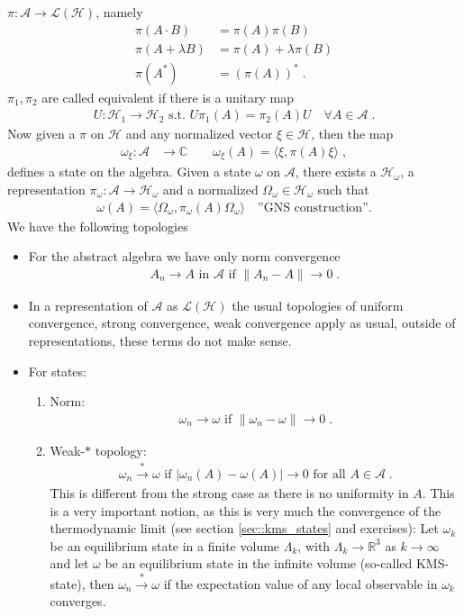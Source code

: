 \documentclass[
a4paper, %
11pt, %
onecolumn, %
openany, %
]{memoir}
\theoremstyle{definition}
\theoremstyle{remark}
\theoremstyle{plain}
\begin{document}
$\pi:\mathcal{A}\longrightarrow \mathcal{L}(\mathcal{H})$, namely \begin{align}
\pi(A\cdot B)&=\pi(A)\pi(B) \\
\pi(A+\lambda B)&=\pi(A)+\lambda\pi(B)\\
\pi(A^*)&=(\pi(A))^*\;.
\end{align}
$\pi_1,\pi_2$ are called equivalent if there is a unitary map \begin{align}
U:\mathcal{H}_1\rightarrow \mathcal{H}_2 \text{ s.t. } U\pi_1(A)=\pi_2(A)U\quad \forall A\in \mathcal{A}\; .
\end{align}
Now given a $\pi$ on $\mathcal{H}$ and any normalized vector $\xi\in\mathcal{H}$, then the map \begin{align}
\omega_{\xi}:\mathcal{A}&\longrightarrow \mathbb{C}\qquad \omega_{\xi}(A)=\langle\xi,\pi(A)\xi\rangle \; ,
\end{align}
defines a state on the algebra. Given a state $\omega$ on $\mathcal{A}$, there exists a $\mathcal{H}_{\omega}$, a representation $\pi_{\omega}:\mathcal{A}\rightarrow \mathcal{H}_{\omega}$ and a normalized $\Omega_{\omega}\in\mathcal{H}_{\omega}$ such that \begin{align}
\omega(A)=\langle\Omega_{\omega},\pi_{\omega}(A)\Omega_{\omega}\rangle \quad \text{''GNS construction''.}
\end{align}
We have the following topologies \begin{itemize}
\item For the abstract algebra we have only norm convergence \begin{align}
A_n\rightarrow A\text{ in }\mathcal{A}\text{ if }\|A_n-A\|\rightarrow 0\; .
\end{align}
\item In a representation of $\mathcal{A}$ as $\mathcal{L}(\mathcal{H})$ the usual topologies of uniform convergence, strong convergence, weak convergence apply as usual, outside of representations, these terms do not make sense.
\item For states: \begin{enumerate}
\item Norm: \begin{align}
\omega_n\rightarrow\omega \text{ if } \|\omega_n-\omega\|\rightarrow 0\; .
\end{align}
\item Weak-$*$ topology: \begin{align}
\omega_n\overset{*}{\rightarrow}\omega \text{ if } |\omega_n(A)-\omega(A)|\rightarrow 0 \text{ for all } A\in\mathcal{A}\;. 
\end{align}
This is different from the strong case as there is no uniformity in $A$. This is a very important notion, as this is very much the convergence of the thermodynamic limit (see section \ref{sec::kms_states} and exercises): Let $\omega_k$ be an equilibrium state in a finite volume $\Lambda_k$, with $\Lambda_k\rightarrow\mathbb{R}^3$ as $k\rightarrow \infty$ and let $\omega$ be an equilibrium state in the infinite volume (so-called KMS-state), then $\omega_n\overset{*}{\rightarrow}\omega$ if the expectation value of any local observable in $\omega_k$ converges. \end{enumerate}
\end{itemize}
\end{document}
